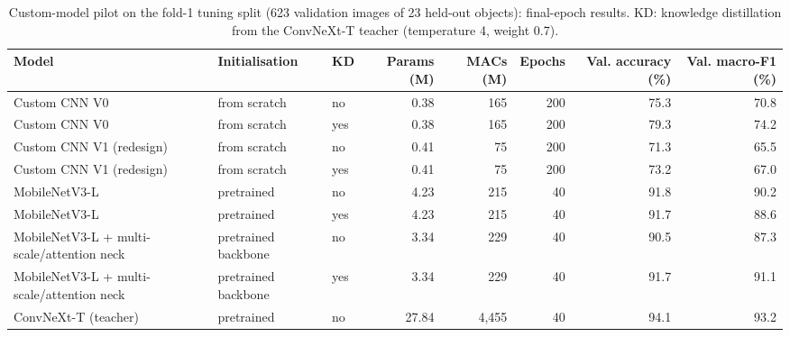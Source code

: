 \begin{table}[!htbp]
\centering
\scriptsize
\caption{Custom-model pilot on the fold-1 tuning split (623 validation images of 23 held-out objects): final-epoch results. KD: knowledge distillation from the ConvNeXt-T teacher (temperature 4, weight 0.7).}
\label{tab:s_pilot}
\begin{adjustbox}{max width=\textwidth}
\begin{tabular}{@{}lllrrrrr@{}}
\toprule
Model & Initialisation & KD & Params (M) & MACs (M) & Epochs & Val. accuracy (\%) & Val. macro-F1 (\%) \\
\midrule
Custom CNN V0 & from scratch & no & 0.38 & 165 & 200 & 75.3 & 70.8 \\
Custom CNN V0 & from scratch & yes & 0.38 & 165 & 200 & 79.3 & 74.2 \\
Custom CNN V1 (redesign) & from scratch & no & 0.41 & 75 & 200 & 71.3 & 65.5 \\
Custom CNN V1 (redesign) & from scratch & yes & 0.41 & 75 & 200 & 73.2 & 67.0 \\
MobileNetV3-L & pretrained & no & 4.23 & 215 & 40 & 91.8 & 90.2 \\
MobileNetV3-L & pretrained & yes & 4.23 & 215 & 40 & 91.7 & 88.6 \\
MobileNetV3-L + multi-scale/attention neck & pretrained backbone & no & 3.34 & 229 & 40 & 90.5 & 87.3 \\
MobileNetV3-L + multi-scale/attention neck & pretrained backbone & yes & 3.34 & 229 & 40 & 91.7 & 91.1 \\
ConvNeXt-T (teacher) & pretrained & no & 27.84 & 4,455 & 40 & 94.1 & 93.2 \\
\bottomrule
\end{tabular}
\end{adjustbox}
\end{table}
